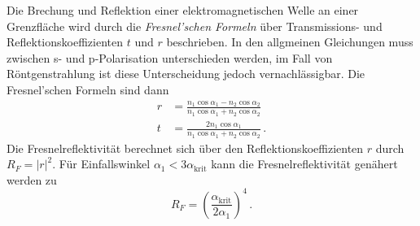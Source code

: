 Die Brechung und Reflektion einer elektromagnetischen Welle an einer Grenzfläche wird durch die 
\textit{Fresnel'schen Formeln} über Transmissions- und Reflektionskoeffizienten $t$ und $r$ beschrieben. 
In den allgmeinen Gleichungen muss zwischen s- und p-Polarisation unterschieden werden, im Fall von 
Röntgenstrahlung ist diese Unterscheidung jedoch vernachlässigbar. Die Fresnel'schen Formeln sind dann 
\begin{align*}
    r &= \frac{n_1 \cos \alpha_1 - n_2 \cos \alpha_2}{n_1 \cos \alpha_1 + n_2 \cos \alpha_2} \\
    t &= \frac{2 n_1 \cos \alpha_1}{n_1 \cos \alpha_1 + n_2 \cos \alpha_2} \, .
\end{align*}
Die Fresnelreflektivität berechnet sich über den Reflektionskoeffizienten $r$ durch $R_F = |r|^2$.
Für Einfallswinkel $\alpha_1 < 3 \alpha_\text{krit}$ kann die Fresnelreflektivität genähert werden zu \cite{dissertation3}
\begin{equation*}
    R_F = \left(\frac{\alpha_\text{krit}}{2 \alpha_1}\right)^4 \, .
\end{equation*}

